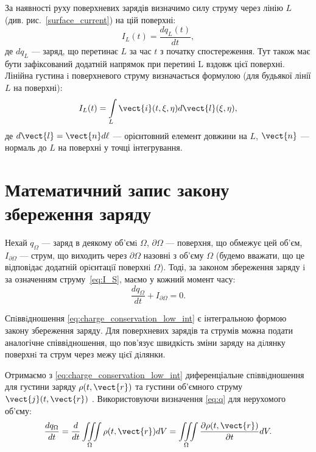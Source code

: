  За наявності руху поверхневих зарядів визначимо силу струму через лінію
$L$ (див. рис.~\ref{surface_current}) на цій поверхні:
\begin{equation}
    I_L(t) = \frac{dq_L(t)}{dt},
\end{equation}
де $dq_L$ --- заряд, що перетинає $L$ за час $ t$ з початку спостереження. Тут також
має бути зафіксований додатній напрямок при перетині L вздовж цієї поверхні.
Лінійна густина i поверхневого струму визначається формулою (для будьякої лінії $L$ на поверхні):
\begin{equation}
    I_L(t) = \int\limits_L \vect{i}(t, \xi, \eta) d\vect{l}(\xi, \eta),
\end{equation}
де $d\vect{l} = \vect{n} d \ell$ --- орієнтовний елемент довжини на $L$, $\vect{n}$ --- нормаль до $L$ на поверхні у
точці інтегрування.



\section{Математичний запис закону збереження заряду}


Нехай $q_{\Omega}$ --- заряд в деякому об'ємi $\Omega$, $\partial\Omega$ --- поверхня, що обмежує цей
об'єм, $I_{\partial\Omega}$ --- струм, що виходить через $\partial\Omega$ назовні з об'єму $\Omega$ (будемо вважати,
що це відповідає додатній орiєнтацiї поверхнi $\Omega$). Тоді, за законом збереження заряду i за означенням струму~\eqref{eq:I_S}, маємо у кожний момент
часу:
\begin{equation}\label{eq:charge_conservation_low_int}
    \frac{dq_{\Omega}}{dt} + I_{\partial\Omega}   = 0.
\end{equation}

Спiввiдношення \eqref{eq:charge_conservation_low_int} є інтегральною формою закону збереження
заряду. Для поверхневих зарядів та струмів можна подати аналогічне
співвідношення, що пов’язує швидкість зміни заряду на дiлянку поверхнi та
струм через межу цiєї дiлянки.

Отримаємо з \eqref{eq:charge_conservation_low_int} диференціальне спiввiдношення для густини заряду
$\rho(t, \vect{r})$ та густини об'ємного струму $\vect{j}(t, \vect{r})$ . Використовуючи визначення \eqref{eq:q}
для нерухомого об'єму:
\begin{equation*}
    \frac{dq_{\Omega}}{dt} = \frac{d}{dt} \iiint\limits_{\Omega} \rho(t, \vect{r}) dV = \iiint\limits_{\Omega} \frac{\partial\rho(t, \vect{r})}{\partial
    t} dV.
\end{equation*}

